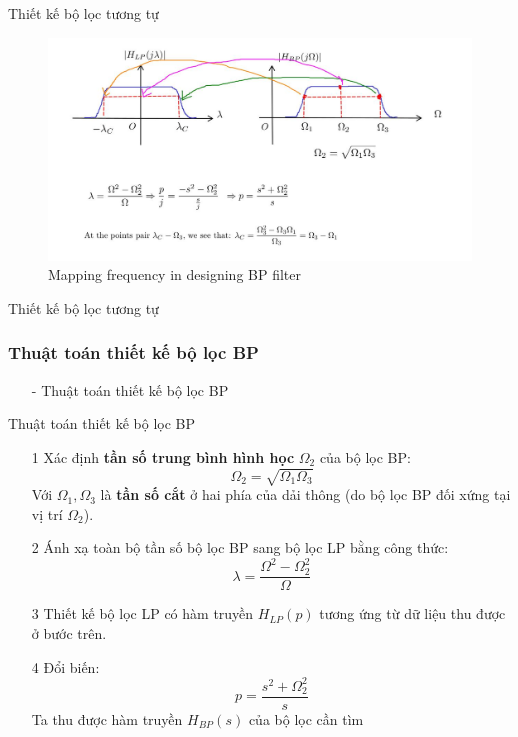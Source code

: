 \documentclass[8pt]{beamer}
\begin{document}
\begin{frame}{Thiết kế bộ lọc tương tự}
\begin{figure}[h]
	\includegraphics[width=1\textwidth]{18.jpg}
	\caption{Mapping frequency in designing BP filter}			\label{fig:re2}
		\end{figure}


\end{frame}
\begin{frame}{Thiết kế bộ lọc tương tự}
\subsubsection{Thuật toán thiết kế bộ lọc BP}
\begin{itemize}
	\item[-] Thuật toán thiết kế bộ lọc BP
\end{itemize}
\begin{block}{Thuật toán thiết kế bộ lọc BP}
\begin{enumerate}
	\item[1] Xác định \textbf{tần số trung bình hình học} $\Omega_{2}$ của bộ lọc BP: $$\Omega_{2}=\sqrt{\Omega_{1}\Omega_{3}}$$
	Với $\Omega_{1},\Omega_{3}$ là \textbf{tần số cắt} ở hai phía của dải thông (do bộ lọc BP đối xứng tại vị trí $\Omega_{2}$).
\item[2] Ánh xạ toàn bộ tần số bộ lọc BP sang bộ lọc LP bằng công thức: $$\lambda=\frac{\Omega^2-\Omega_{2}^2}{\Omega}$$
\item[3] Thiết kế bộ lọc LP có hàm truyền $H_{LP}(p)$ tương ứng từ dữ liệu thu được ở bước trên.
\item[4] Đổi biến: $$p=\frac{s^2+\Omega_{2}^2}{s}$$ 
	Ta thu được hàm truyền $H_{BP}(s)$ của bộ lọc cần tìm
\end{enumerate}
\end{block}
\end{frame}
\end{document}
